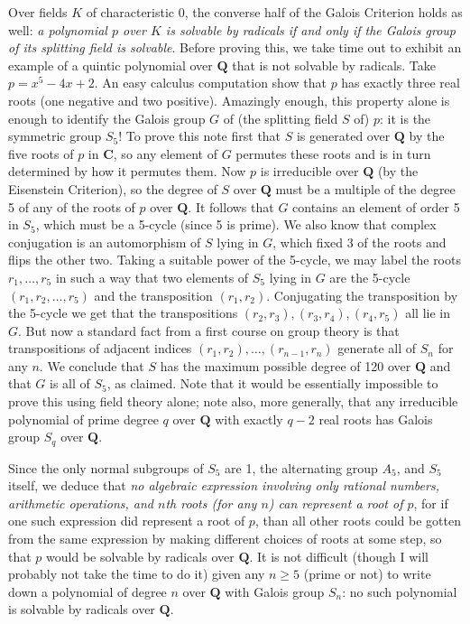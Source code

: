 \documentclass[10pt]{article}
\begin{document}
Over fields $K$ of characteristic 0, the converse half of the Galois
Criterion holds as well: {\sl a polynomial $p$ over $K$ is solvable by
  radicals if and only if the Galois group of its splitting field is
  solvable}. Before proving this, we take time out to exhibit an example
of a quintic polynomial over $\mathbf Q$ that is not solvable by
radicals. Take $p= x^5 - 4x + 2$. An easy calculus computation show that
$p$ has exactly three real roots (one negative and two positive).
Amazingly enough, this property alone is enough to identify the Galois
group $G$ of (the splitting field $S$ of) $p$: it is the symmetric group
$S_5$! To prove this note first that $S$ is generated over $\mathbf Q$
by the five roots of $p$ in $\mathbf C$, so any element of $G$ permutes
these roots and is in turn determined by how it permutes them. Now $p$
is irreducible over $\mathbf Q$ (by the Eisenstein Criterion), so the
degree of $S$ over $\mathbf Q$ must be a multiple of the degree 5 of any
of the roots of $p$ over $\mathbf Q$. It follows that $G$ contains an
element of order 5 in $S_5$, which must be a 5-cycle (since 5 is prime).
We also know that complex conjugation is an automorphism of $S$ lying in
$G$, which fixed 3 of the roots and flips the other two. Taking a
suitable power of the 5-cycle, we may label the roots $r_1,\ldots,r_5$
in such a way that two elements of $S_5$ lying in $G$ are the 5-cycle
$(r_1, r_2,\ldots,r_5)$ and the transposition $(r_1,r_2)$. Conjugating
the transposition by the 5-cycle we get that the transpositions
$(r_2,r_3),(r_3,r_4),(r_4,r_5)$ all lie in $G$. But now a standard fact
from a first course on group theory is that transpositions of adjacent
indices $(r_1,r_2),\ldots,(r_{n-1},r_n)$ generate all of $S_n$ for any
$n$. We conclude that $S$ has the maximum possible degree of 120 over
$\mathbf Q$ and that $G$ is all of $S_5$, as claimed. Note that it would
be essentially impossible to prove this using field theory alone; note
also, more generally, that any irreducible polynomial of prime degree
$q$ over $\mathbf Q$ with exactly $q-2$ real roots has Galois group
$S_q$ over $\mathbf Q$.

Since the only normal subgroups of $S_5$ are 1, the alternating group
$A_5$, and $S_5$ itself, we deduce that {\sl no algebraic expression
  involving only rational numbers, arithmetic operations, and $n$th
  roots (for any $n$) can represent a root of $p$}, for if one such
expression did represent a root of $p$, than all other roots could be
gotten from the same expression by making different choices of roots at
some step, so that $p$ would be solvable by radicals over $\mathbf Q$.
It is not difficult (though I will probably not take the time to do it)
given any $n\ge5$ (prime or not) to write down a polynomial of degree
$n$ over $\mathbf Q$ with Galois group $S_n$: no such polynomial is
solvable by radicals over $\mathbf Q$.
\end{document}
